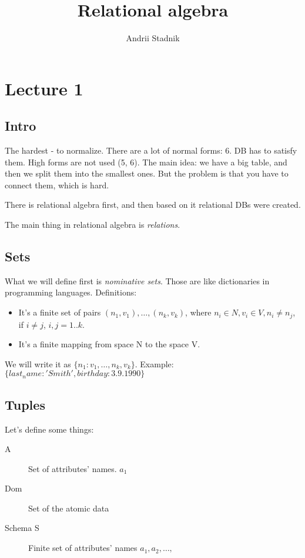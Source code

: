 \documentclass[a4paper]{article}
\title{Relational algebra}
\author{Andrii Stadnik}
\begin{document}
	\maketitle
	\tableofcontents
	\section{Lecture 1}
	\subsection{Intro}

	The hardest - to normalize. There are a lot of normal forms: 6. DB has to
	satisfy them. High forms are not used (5, 6). The main idea: we have a big
	table, and then we split them into the smallest ones. But the problem is
	that you have to connect them, which is hard. 

	There is relational algebra first, and then based on it relational DBs were
	created.

	The main thing in relational algebra is \emph{relations}.

	\subsection{Sets}

	What we will define first is \emph{nominative sets}. Those are like
	dictionaries in programming languages. 
	Definitions:
	\begin{itemize}
		\item It's a finite set of pairs ${(n_1, v_1), \ldots, (n_k, v_k)}$,
			where $n_i \in N, v_i \in V, n_i \neq n_j$, if $i \neq j$, $i, j =
			1..k $.
		\item It's a finite mapping from space N to the space V.
	\end{itemize}
	We will write it as $\{n_1: v_1, \ldots, n_k, v_k\}$.
	Example: $\{last_name:'Smith', birthday:3.9.1990\}$
	\subsection{Tuples}
	Let's define some things:
	\begin{description}
		\item[A] Set of attributes' names. $a_1$
		\item[Dom] Set of the atomic data
		\item[Schema S] Finite set of attributes' names $a_1, a_2, \ldots, $
	\end{description}
\end{document}
